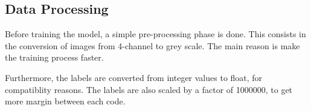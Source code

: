 \subsection{Data Processing}

Before training the model, a simple pre-processing phase is done. This consists in the conversion of images from 4-channel to grey scale. The main reason is make the training process faster.

Furthermore, the labels are converted from integer values to float, for compatiblity reasons. The labels are also scaled by a factor of 1000000, to get more margin between each code.